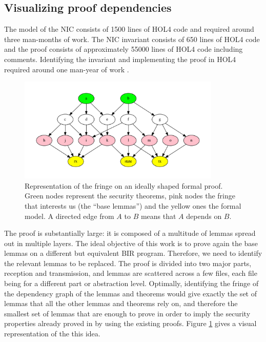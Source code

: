 \documentclass{kththesis}
\begin{document}
{\subsection{Visualizing proof dependencies}

The model of the NIC consists of \num{1500} lines of HOL4 code and required around three man-months of work. The NIC invariant consists of \num{650} lines of HOL4 code and the proof consists of approximately \num{55000} lines of HOL4 code including comments. Identifying the invariant and implementing the proof in HOL4 required around one man-year of work \cite{haglund_trustworthy_nodate}.

\begin{figure}[tb]
	\includegraphics[height=5cm]{figures/fringe.pdf}
	\centering
	\caption{Representation of the fringe on an ideally shaped formal proof. Green nodes represent the security theorems, pink nodes the fringe that interests us (the ``base lemmas'') and the yellow ones the formal model. A directed edge from $A$ to $B$ means that $A$ depends on $B$.}
	\label{fringe}
\end{figure}

The proof is substantially large: it is composed of a multitude of lemmas spread out in multiple layers. The ideal objective of this work is to prove again the base lemmas on a different but equivalent BIR program. Therefore, we need to identify the relevant lemmas to be replaced. The proof is divided into two major parts, reception and transmission, and lemmas are scattered across a few files, each file being for a different part or abstraction level. Optimally, identifying the fringe of the dependency graph of the lemmas and theorems would give exactly the set of lemmas that all the other lemmas and theorems rely on, and therefore the smallest set of lemmas that are enough to prove in order to imply the security properties already proved in \cite{haglund_trustworthy_nodate} by using the existing proofs. Figure \ref{fringe} gives a visual representation of the this idea.

}
\end{document}

